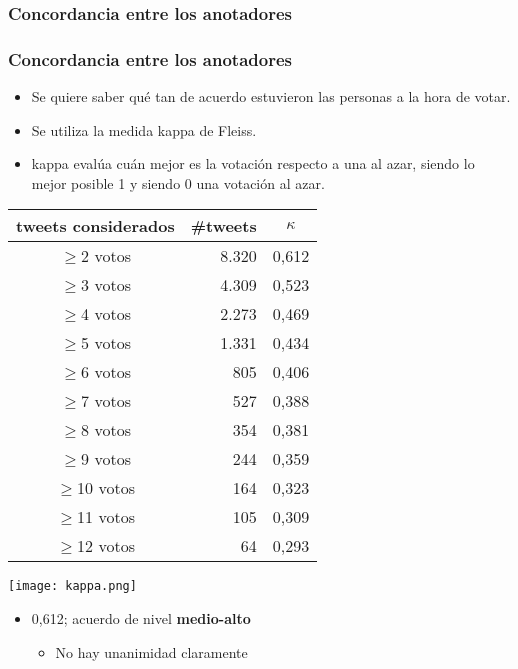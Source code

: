 \subsubsection{Concordancia entre los anotadores}

\begin{frame}[allowframebreaks]
    \frametitle{Concordancia entre los anotadores}

    \begin{itemize}
        \item Se quiere saber qué tan de acuerdo estuvieron las personas a la hora de votar.
        \item Se utiliza la medida kappa de Fleiss.
        \item kappa evalúa cuán mejor es la votación respecto a una al azar, siendo lo mejor posible 1 y siendo 0 una votación al azar.
    \end{itemize}

    \framebreak

    \begin{center}
        \begin{tabular}{ c | r | c }
            tweets considerados & \#tweets & $\kappa$ \\
            \hline
            $\geq$2 votos & 8.320 & 0,612 \\
            $\geq$3 votos & 4.309 & 0,523 \\
            $\geq$4 votos & 2.273 & 0,469 \\
            $\geq$5 votos & 1.331 & 0,434 \\
            $\geq$6 votos & 805 & 0,406 \\
            $\geq$7 votos & 527 & 0,388 \\
            $\geq$8 votos & 354 & 0,381 \\
            $\geq$9 votos & 244 & 0,359 \\
            $\geq$10 votos & 164 & 0,323 \\
            $\geq$11 votos & 105 & 0,309 \\
            $\geq$12 votos & 64 & 0,293 \\
        \end{tabular}

        \texttt{[image: kappa.png]}
    \end{center}

    \framebreak

    \begin{itemize}
        \item \large{0,612; acuerdo de nivel \textbf{medio-alto}}

        \begin{itemize}
            \item No hay unanimidad claramente
        \end{itemize}
    \end{itemize}
\end{frame}

